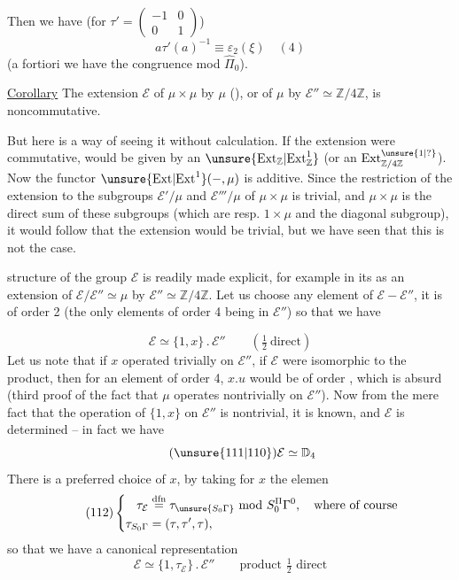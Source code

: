
Then we have (for $\tau'=\begin{pmatrix}-1&0\\0&1\end{pmatrix}$)
\[
a\tau'(a)^{-1}\equiv\varepsilon_2(\xi)\quad(4)
\]
(a fortiori we have the congruence mod $\widehat{\Pi}_0$).

\uline{Corollary} The extension $\mathcal E$ of $\mu\times\mu$ by $\mu$
(), or of $\mu$ by $\mathcal E''\simeq\mathbb Z/4\mathbb Z$, is noncommutative.
\margin{$\big|$}

But here is a way of seeing it without calculation. If the extension were commutative,
  would be given by an
$\unsure{\mathrm{Ext}_{\mathbb Z}|\mathrm{Ext}^1_{\mathbb Z}}$
(or an $\mathrm{Ext}^{\unsure{1|?}}_{\mathbb Z/4\mathbb Z}$).
Now the functor $\unsure{\mathrm{Ext}|\mathrm{Ext}^1}(-,\mu)$ is additive. Since the restriction of
the extension to the subgroups $\mathcal E'/\mu$ and $\mathcal E'''/\mu$ of
$\mu\times\mu$ is trivial, and $\mu\times\mu$ is
the direct sum of these subgroups (which are resp. $1\times\mu$ and the
diagonal subgroup), it would follow that the extension would be
trivial, but we have seen that this is not the case.

  structure of the group $\mathcal E$
is readily made explicit, for example in its  as an extension of
$\mathcal E/\mathcal E''\simeq\mu$ by
$\mathcal E''\simeq\mathbb Z/4\mathbb Z$. 
Let us choose any element of $\mathcal E-\mathcal E''$, it is
of order 2 (the only elements of order 4 being in $\mathcal E''$) so
that we have


\[
\tag{110}
\mathcal E\simeq\{1,x\}\mathbin{.}\mathcal E''
\qquad\left(\tfrac12\ \text{direct}\right)
\]
Let us note that if $x$ operated trivially on $\mathcal E''$,
 if $\mathcal E$ were isomorphic to the product, then for an
element  of order 4,
$x.u$ would be of order , which is absurd (third proof of the fact
that  $\mu$ operates nontrivially
on $\mathcal E''$). Now from the mere fact that the operation of $\{1,x\}$ on
$\mathcal E''$ is nontrivial, it is known, and
 $\mathcal E$ is determined -- in fact we have
\[
\tag{\unsure{111|110}}
\mathcal E\simeq\mathbb D_4
\]
There is a preferred choice of $x$, by taking for $x$ the elemen
\[
\tag{112}
\left\{\begin{aligned}
\tau_{\mathcal E}&\overset{\mathrm{dfn}}{=}
\tau_{\unsure{S_0\Gamma}}\ \mathrm{mod}\ S_0^{\Pi}\Gamma^0,
\quad\text{where of course}\\
\tau_{S_0\Gamma}&=(\tau,\tau',\tau),
\end{aligned}\right.
\]
so that we have a canonical representation
\[
\tag{113}
\mathcal E\simeq\{1,\tau_{\mathcal E}\}\mathbin{.}
\mathcal E''
\qquad\text{product }\tfrac12\text{ direct}
\]

